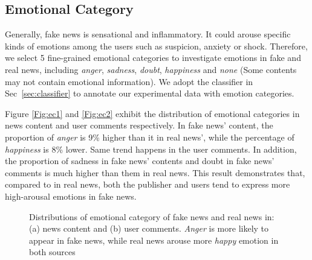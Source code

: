 \documentclass[conference]{IEEEtran}
\newcommand{\kai}[1]{\textcolor{blue}{Kai: {#1}}}
\begin{document}
	\subsection{Emotional Category}
	Generally, fake news is sensational and inflammatory. It could arouse specific kinds of emotions among the users such as suspicion, anxiety or shock. Therefore, we select 5 fine-grained emotional categories to investigate emotions in fake and real news, including \textit{anger}, \textit{sadness}, \textit{doubt}, \textit{happiness} and \textit{none} (Some contents may not contain emotional information). We adopt the classifier in Sec~\ref{sec:classifier} to annotate our experimental data with emotion categories. 
	
	Figure \ref{Fig:ec1} and \ref{Fig:ec2} exhibit the distribution of emotional categories in news content and user comments respectively. In fake news' content, the proportion of \textit{anger} is 9\% higher than it in real news’, while the percentage of \textit{happiness} is 8\% lower. Same trend happens in the user comments. In addition, the proportion of sadness in fake news' contents and doubt in fake news' comments is much higher than them in real news.  This result demonstrates that, compared to in real news, both the publisher and users tend to express more high-arousal emotions in fake news.
	
	\begin{figure}[h]
		\centering
		
		\begin{minipage}[t]{0.24\textwidth}
		\end{minipage}
		\begin{minipage}[t]{0.24\textwidth}
		\end{minipage}
		
		\caption{Distributions of emotional category of fake news and real news in: (a) news content and (b) user comments. {\em Anger} is more likely to appear in fake news, while real news arouse more {\em happy} emotion in both sources}
		\label{Fig:emotionCategories}
	\end{figure}
	
\end{document}
